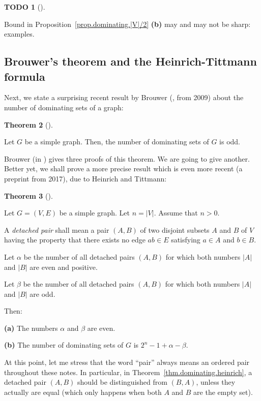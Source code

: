 \documentclass[numbers=enddot,12pt,final,onecolumn,notitlepage]{scrartcl}%
\theoremstyle{definition}
\newtheorem{theo}{Theorem}[subsection]
\newenvironment{theorem}[1][]
{\begin{theo}[#1]\begin{leftbar}}
{\end{leftbar}\end{theo}}
\newtheorem{quest}[theo]{TODO}
\newenvironment{todo}[1][]
{\begin{quest}[#1]\begin{leftbar}}
{\end{leftbar}\end{quest}}
\newcommand{\abs}[1]{\left| #1 \right|}
\newcommand{\tup}[1]{\left( #1 \right)}
\begin{document}
\begin{todo}
Bound in Proposition~\ref{prop.dominating.|V|/2} \textbf{(b)}
may and may not be sharp: examples.
\end{todo}

\subsection{\label{subsect.dominating.odd}Brouwer's theorem and the
Heinrich-Tittmann formula}

Next, we state a surprising recent result by Brouwer (\cite{Brouwe09},
from 2009) about the number of dominating sets of a graph:

\begin{theorem} \label{thm.dominating.brouwer}
Let $G$ be a simple graph. Then, the number of dominating sets of $G$
is odd.
\end{theorem}

Brouwer (in \cite{Brouwe09}) gives three proofs of this theorem. We
are going to give another. Better yet, we shall prove a more
precise result which is even more recent (a preprint \cite{HeiTit17}
from 2017), due to Heinrich and Tittmann:

\begin{theorem} \label{thm.dominating.heinrich}
Let $G = \tup{V, E}$ be a simple graph. Let $n = \abs{V}$. Assume that
$n > 0$.

A \textit{detached pair} shall mean a pair $\tup{A, B}$ of two
disjoint subsets $A$ and $B$ of $V$ having the property that
there exists no edge $ab \in E$ satisfying
$a \in A$ and $b \in B$.

Let $\alpha$ be the number of all detached pairs $\tup{A, B}$ for
which both numbers $\abs{A}$ and $\abs{B}$ are even and positive.

Let $\beta$ be the number of all detached pairs $\tup{A, B}$ for
which both numbers $\abs{A}$ and $\abs{B}$ are odd.

Then:

\textbf{(a)} The numbers $\alpha$ and $\beta$ are even.

\textbf{(b)} The number of dominating sets of $G$ is
$2^n - 1 + \alpha - \beta$.
\end{theorem}

At this point, let me stress that the word ``pair'' always means an
ordered pair throughout these notes. In particular, in
Theorem~\ref{thm.dominating.heinrich}, a detached pair $\tup{A, B}$
should be distinguished from $\tup{B, A}$, unless they actually are
equal (which only happens when both $A$ and $B$ are the empty set).
\end{document}

